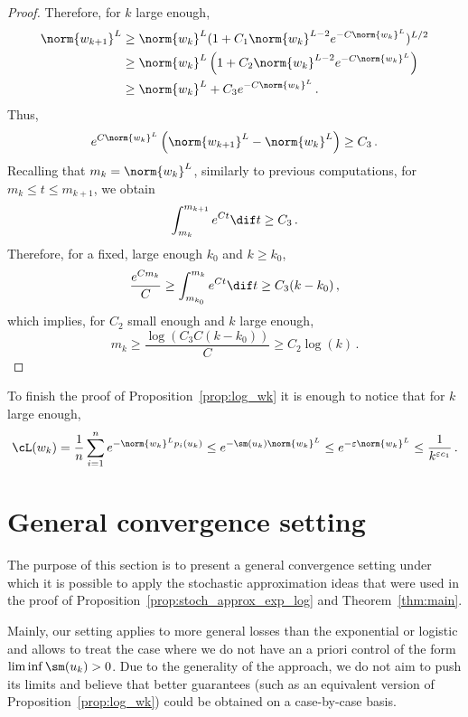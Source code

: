 \begin{proof}
Therefore, for $k$ large enough, 
\begin{equation*}
  \begin{split}
    \norm{w_{k+1}}^L &\geq \norm{w_k}^L(1 + C_1 \norm{w_k}^{L-2} e^{-C\norm{w_k}^L})^{L/2} \\
    &\geq \norm{w_k}^L\left( 1 + C_2 \norm{w_k}^{L-2}e^{-C\norm{w_k}^L}\right)\\
    &\geq \norm{w_k}^L + C_3 e^{-C \norm{w_k}^L}\, .
  \end{split}
\end{equation*}
Thus,
\begin{equation*}
  e^{ C\norm{w_k}^L} \left(\norm{w_{k+1}}^L - \norm{w_k}^L\right)\geq C_3\, .
\end{equation*}
Recalling that $m_k = \norm{w_k}^L$, similarly to previous computations, for $m_{k}\leq t\leq m_{k+1} $, we obtain 
\begin{equation*}
  \int_{m_k}^{m_{k+1}}e^{Ct} \dif t\geq C_3\, .
\end{equation*}
Therefore, for a fixed, large enough $k_0$ and $k \geq k_0$,  
\begin{equation*}
\frac{e^{C m_{k}}}{ C}\geq \int_{m_{k_0}}^{m_{k}} e^{C t} \dif t \geq C_3(k - k_0)\, ,
\end{equation*}
which implies, for $C_2$ small enough and $k$ large enough,
\begin{equation*}
  m_{k} \geq \frac{\log(C_3  C(k-k_0))}{C} \geq C_2 \log(k)\, .
\end{equation*}
\end{proof}

To finish the proof of Proposition~\ref{prop:log_wk} it is enough to notice that for $k$ large enough,
\begin{equation*}
  \cL(w_k) = \frac{1}{n}\sum_{i=1}^n e^{-\norm{w_k}^L p_i(u_k)} \leq e^{-\sm(u_k) \norm{w_k}^L} \leq e^{-\varepsilon \norm{w_k}^L } \leq \frac{1}{k^{\varepsilon c_1}}\, .
\end{equation*}

\section{General convergence setting}\label{app:gen_sett}
The purpose of this section is to present a general convergence setting under which it is possible to apply the stochastic approximation ideas that were used in the proof of Proposition~\ref{prop:stoch_approx_exp_log} and Theorem~\ref{thm:main}. 

Mainly, our setting applies to more general losses than the exponential or logistic and allows to treat the case where we do not have an a priori control of the form $\liminf \sm(u_k) >0$. Due to the generality of the approach, we do not aim to push its limits and believe that better guarantees (such as an equivalent version of Proposition~\ref{prop:log_wk}) could be obtained on a case-by-case basis.


